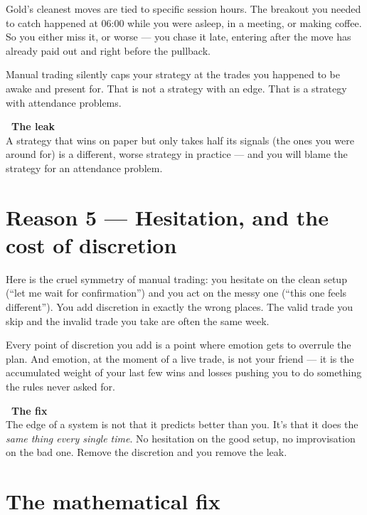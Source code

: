 \documentclass[11pt]{article}
\newcommand{\fixlabel}{{\color{neon}\bfseries\faArrowRight\ The fix }}
\newcommand{\leaklabel}{{\color{inkmuted}\bfseries\faExclamationTriangle\ The leak }}
\begin{document}
Gold's cleanest moves are tied to specific session hours. The breakout you needed to catch happened at 06:00 while you were asleep, in a meeting, or making coffee. So you either miss it, or worse --- you chase it late, entering after the move has already paid out and right before the pullback.

Manual trading silently caps your strategy at the trades you happened to be awake and present for. That is not a strategy with an edge. That is a strategy with attendance problems.

\begin{leakbox}
\leaklabel\\[0.4ex]
A strategy that wins on paper but only takes half its signals (the ones you were around for) is a different, worse strategy in practice --- and you will blame the strategy for an attendance problem.
\end{leakbox}

\newpage

\section{Reason 5 --- Hesitation, and the cost of discretion}

Here is the cruel symmetry of manual trading: you hesitate on the clean setup (``let me wait for confirmation'') and you act on the messy one (``this one feels different''). You add discretion in exactly the wrong places. The valid trade you skip and the invalid trade you take are often the same week.

Every point of discretion you add is a point where emotion gets to overrule the plan. And emotion, at the moment of a live trade, is not your friend --- it is the accumulated weight of your last few wins and losses pushing you to do something the rules never asked for.

\begin{fixbox}
\fixlabel\\[0.4ex]
The edge of a system is not that it predicts better than you. It's that it does the \emph{same thing every single time}. No hesitation on the good setup, no improvisation on the bad one. Remove the discretion and you remove the leak.
\end{fixbox}

\section{The mathematical fix}
\end{document}
